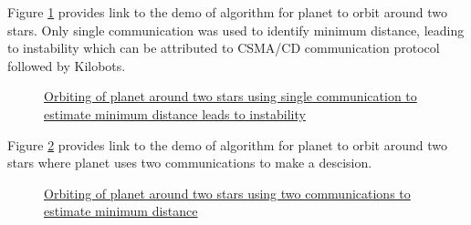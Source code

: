 \documentclass{report}[12pt]
\begin{document}
Figure \ref{fig:orbit_two_star_comm1} provides link to the demo of algorithm for planet to orbit around two stars. Only single communication was used to identify minimum distance, leading to instability which can be attributed to CSMA/CD \cite{WEBOPEDIA-csma-cd} communication protocol followed by Kilobots.
\begin{figure}[H]
    \centering
    \caption{\href{https://youtu.be/mhW04WvGKuQ}{Orbiting of planet around two stars using single communication to estimate minimum distance leads to instability}}
    \label{fig:orbit_two_star_comm1}
\end{figure}

Figure \ref{fig:orbit_two_star} provides link to the demo of algorithm for planet to orbit around two stars where planet uses two communications to make a descision.
\begin{figure}[H]
    \centering
    \caption{\href{https://youtu.be/EKvty2OxXxM}{Orbiting of planet around two stars using two communications to estimate minimum distance}}
    \label{fig:orbit_two_star}
\end{figure}
\end{document}
